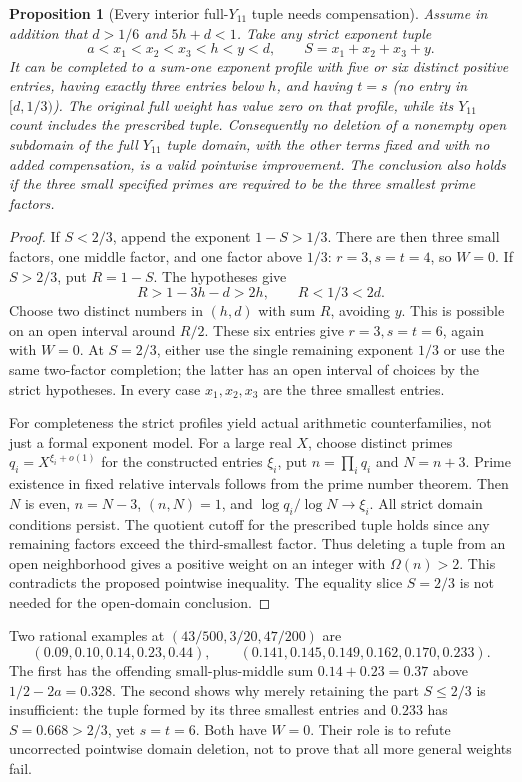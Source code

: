 \documentclass[11pt]{article}
\newtheorem{proposition}[theorem]{Proposition}
\begin{document}
\begin{proposition}[Every interior full-$Y_{11}$ tuple needs compensation]
Assume in addition that $d>1/6$ and $5h+d<1$.
Take any strict exponent tuple
\[
 a<x_1<x_2<x_3<h<y<d,
 \qquad S=x_1+x_2+x_3+y.
\]
It can be completed to a sum-one exponent profile with five or six
distinct positive entries, having exactly three entries below $h$,
and having $t=s$ (no entry in $[d,1/3)$).
The original full weight has value zero on that profile, while its
$Y_{11}$ count includes the prescribed tuple.
Consequently no deletion of a nonempty open subdomain of the full
$Y_{11}$ tuple domain, with the other terms fixed and with no added
compensation, is a valid pointwise improvement.  The conclusion also
holds if the three small specified primes are required to be the
three smallest prime factors.
\end{proposition}

\begin{proof}
If $S<2/3$, append the exponent $1-S>1/3$.
There are then three small factors, one middle factor, and one factor
above $1/3$: $r=3,s=t=4$, so $W=0$.
If $S>2/3$, put $R=1-S$.  The hypotheses give
\[
 R>1-3h-d>2h,\qquad R<1/3<2d.
\]
Choose two distinct numbers in $(h,d)$ with sum $R$, avoiding $y$.
This is possible on an open interval around $R/2$.  These six entries
give $r=3,s=t=6$, again with $W=0$.  At $S=2/3$, either use the
single remaining exponent $1/3$ or use the same two-factor completion;
the latter has an open interval of choices by the strict hypotheses.
In every case $x_1,x_2,x_3$ are the three smallest entries.

For completeness the strict profiles yield actual arithmetic
counterfamilies, not just a formal exponent model.  For a large real
$X$, choose distinct primes $q_i=X^{\xi_i+o(1)}$ for the constructed
entries $\xi_i$, put $n=\prod_iq_i$ and $N=n+3$.
Prime existence in fixed relative intervals follows from the prime
number theorem.  Then $N$ is even, $n=N-3$, $(n,N)=1$, and
$\log q_i/\log N\to\xi_i$.  All strict domain conditions persist.
The quotient cutoff for the prescribed tuple holds since any remaining
factors exceed the third-smallest factor.  Thus deleting a tuple from
an open neighborhood gives a positive weight on an integer with
$\Omega(n)>2$.  This contradicts the proposed pointwise inequality.
The equality slice $S=2/3$ is not needed for the open-domain conclusion.
\end{proof}

Two rational examples at $(43/500,3/20,47/200)$ are
\[
 (0.09,0.10,0.14,0.23,0.44),\qquad
 (0.141,0.145,0.149,0.162,0.170,0.233).
\]
The first has the offending small-plus-middle sum $0.14+0.23=0.37$
above $1/2-2a=0.328$.  The second shows why merely retaining the
part $S\le2/3$ is insufficient: the tuple formed by its three smallest
entries and $0.233$ has $S=0.668>2/3$, yet $s=t=6$.
Both have $W=0$.  Their role is to refute uncorrected pointwise
domain deletion, not to prove that all more general weights fail.
\end{document}
